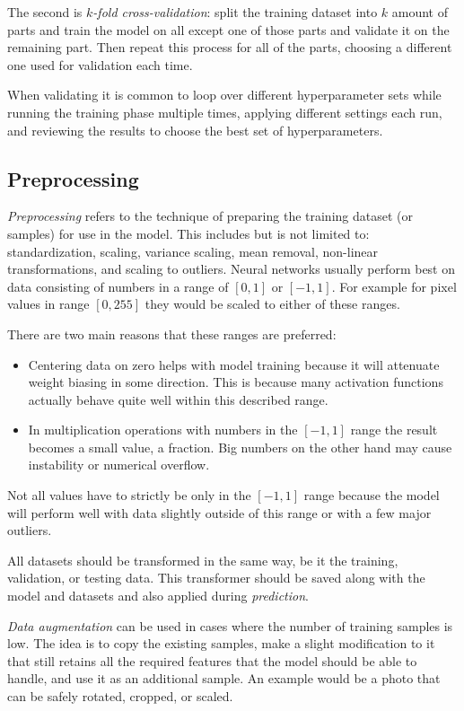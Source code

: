 \documentclass[a4paper]{article}
\begin{document}
The second is \emph{$k$-fold cross-validation}: split the training dataset into $k$ amount of parts and train the model on all except one of those parts and validate it on the remaining part. Then repeat this process for all of the parts, choosing a different one used for validation each time.

When validating it is common to loop over different hyperparameter sets while running the training phase multiple times, applying different settings each run, and reviewing the results to choose the best set of hyperparameters.

\subsection*{Preprocessing}
\emph{Preprocessing} refers to the technique of preparing the training dataset (or samples) for use in the model. This includes but is not limited to: standardization, scaling, variance scaling, mean removal, non-linear transformations, and scaling to outliers. Neural networks usually perform best on data consisting of numbers in a range of $[0,1]$ or $[-1,1]$. For example for pixel values in range $[0,255]$ they would be scaled to either of these ranges.

There are two main reasons that these ranges are preferred:

\begin{itemize}
    \item Centering data on zero helps with model training because it will attenuate weight biasing in some direction. This is because many activation functions actually behave quite well within this described range. 
    \item In multiplication operations with numbers in the $[-1,1]$ range the result becomes a small value, a fraction. Big numbers on the other hand may cause instability or numerical overflow.
\end{itemize}

Not all values have to strictly be only in the $[-1,1]$ range because the model will perform well with data slightly outside of this range or with a few major outliers.

All datasets should be transformed in the same way, be it the training, validation, or testing data. This transformer should be saved along with the model and datasets and also applied during \emph{prediction}.

\emph{Data augmentation} can be used in cases where the number of training samples is low. The idea is to copy the existing samples, make a slight modification to it that still retains all the required features that the model should be able to handle, and use it as an additional sample. An example would be a photo that can be safely rotated, cropped, or scaled.
\end{document}
